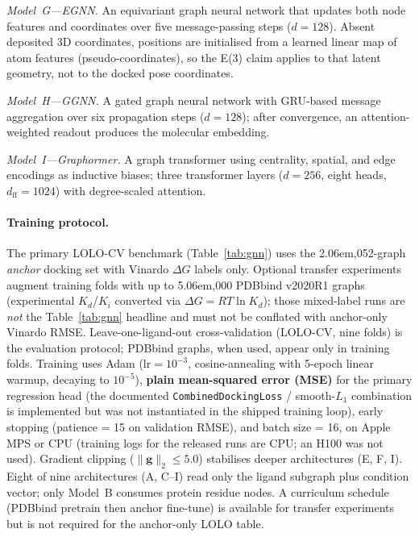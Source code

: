 \documentclass[11pt]{article}
\begin{document}
\emph{Model~G---EGNN.}
An equivariant graph neural network that updates both node features and
coordinates over five message-passing steps ($d = 128$).
Absent deposited 3D coordinates, positions are initialised from a
learned linear map of atom features (pseudo-coordinates), so the
\textsf{E(3)} claim applies to that latent geometry, not to the docked
pose coordinates.

\emph{Model~H---GGNN.}
A gated graph neural network with GRU-based message aggregation over
six propagation steps ($d = 128$); after convergence, an
attention-weighted readout produces the molecular embedding.

\emph{Model~I---Graphormer.}
A graph transformer using centrality, spatial, and edge encodings as
inductive biases; three transformer layers ($d = 256$,
eight heads, $d_{\text{ff}} = 1024$) with degree-scaled attention.

\paragraph{Training protocol.}
The primary LOLO-CV benchmark (Table~\ref{tab:gnn}) uses the
2\kern .06em,052-graph \emph{anchor} docking set with Vinardo
$\Delta G$ labels only.
Optional transfer experiments augment training folds with up to
5\kern .06em,000 PDBbind v2020R1 graphs (experimental $K_{d}$/$K_{i}$
converted via $\Delta G = RT\ln K_{d}$); those mixed-label runs are
\emph{not} the Table~\ref{tab:gnn} headline and must not be conflated
with anchor-only Vinardo RMSE.
Leave-one-ligand-out cross-validation (LOLO-CV, nine folds) is the
evaluation protocol; PDBbind graphs, when used, appear only in training
folds.
Training uses Adam ($\mathrm{lr} = 10^{-3}$, cosine-annealing with
5-epoch linear warmup, decaying to $10^{-5}$),
\textbf{plain mean-squared error (MSE)} for the primary regression head
(the documented \texttt{CombinedDockingLoss} / smooth-$L_{1}$ combination
is implemented but was not instantiated in the shipped training loop),
early stopping (patience = 15 on validation RMSE), and batch size = 16,
on Apple MPS or CPU (training logs for the released runs are CPU;
an H100 was not used).
Gradient clipping ($\|\mathbf{g}\|_{2} \leq 5.0$) stabilises deeper
architectures (E, F, I).
Eight of nine architectures (A, C--I) read only the ligand subgraph plus
condition vector; only Model~B consumes protein residue nodes.
A curriculum schedule (PDBbind pretrain then anchor fine-tune) is
available for transfer experiments but is not required for the
anchor-only LOLO table.
\end{document}
